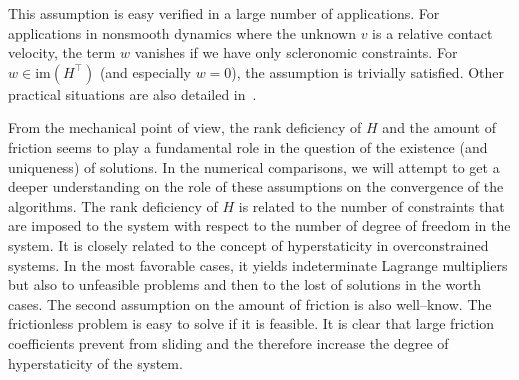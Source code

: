 This assumption is easy verified in a large number of applications. For applications in nonsmooth dynamics where the unknown $v$ is a relative contact velocity, the term $w$ vanishes if we have only scleronomic constraints. For $w \in \mathrm{im}(H^\top)$ (and especially $w=0$), the assumption is trivially satisfied. Other practical situations are also detailed in~\cite{Acary.Cadoux2013}. 

From the mechanical point of view, the rank deficiency of $H$ and the amount of friction seems to play a fundamental role in the question of the existence (and uniqueness) of solutions. In the numerical comparisons, we will attempt to get a deeper understanding on the role of these assumptions on the convergence of the algorithms. The rank deficiency  of $H$ is related to the number of constraints that are imposed to the system with respect to the number of degree of freedom in the system. It is closely related to the concept of hyperstaticity in overconstrained systems. In the most favorable cases, it yields  indeterminate Lagrange multipliers but also to unfeasible problems and then to the lost of solutions in the worth cases. The second assumption on the amount of friction is also well--know. The frictionless problem is  easy to solve if it is  feasible. It is clear that large friction coefficients prevent from sliding and the therefore increase the degree of hyperstaticity of the system. 




